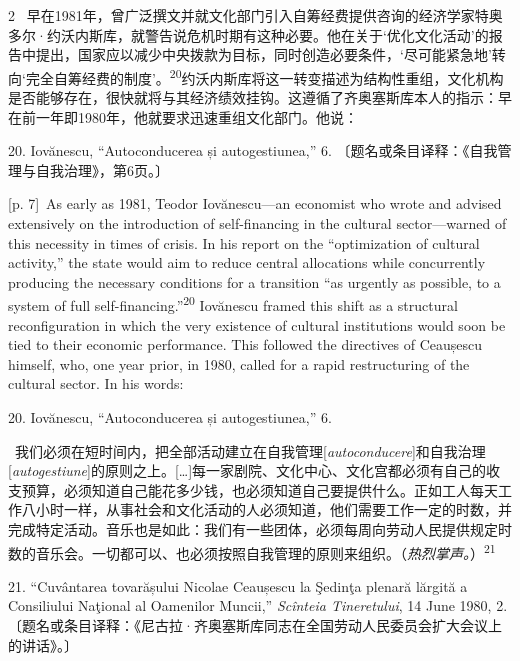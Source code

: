 \documentclass[10pt,a4paper]{article}
\begin{document}
\begin{paracol}{2}
\switchcolumn*
{\scriptsize\color{gray} [p. 7]}\ 早在1981年，曾广泛撰文并就文化部门引入自筹经费提供咨询的经济学家特奥多尔·约沃内斯库，就警告说危机时期有这种必要。他在关于‘优化文化活动’的报告中提出，国家应以减少中央拨款为目标，同时创造必要条件，‘尽可能紧急地’转向‘完全自筹经费的制度’。\nobreak\textsuperscript{20}约沃内斯库将这一转变描述为结构性重组，文化机构是否能够存在，很快就将与其经济绩效挂钩。这遵循了齐奥塞斯库本人的指示：早在前一年即1980年，他就要求迅速重组文化部门。他说：\par{\small 20. Iovănescu, “Autoconducerea și autogestiunea,” 6. 〔题名或条目译释：《自我管理与自我治理》，第6页。〕\par}
\switchcolumn
{\scriptsize\color{gray} [p. 7]}\ As early as 1981, Teodor Iovănescu—an economist who wrote and advised extensively on the introduction of self-financing in the cultural sector—warned of this necessity in times of crisis. In his report on the “optimization of cultural activity,” the state would aim to reduce central allocations while concurrently producing the necessary conditions for a transition “as urgently as possible, to a system of full self-financing.”\nobreak\textsuperscript{20} Iovănescu framed this shift as a structural reconfiguration in which the very existence of cultural institutions would soon be tied to their economic performance. This followed the directives of Ceaușescu himself, who, one year prior, in 1980, called for a rapid restructuring of the cultural sector. In his words:\par{\small 20. Iovănescu, “Autoconducerea și autogestiunea,” 6.\par}
\switchcolumn*
{\scriptsize\color{gray} [p. 7]}\ 我们必须在短时间内，把全部活动建立在自我管理[\textit{autoconducere}]和自我治理[\textit{autogestiune}]的原则之上。[…]每一家剧院、文化中心、文化宫都必须有自己的收支预算，必须知道自己能花多少钱，也必须知道自己要提供什么。正如工人每天工作八小时一样，从事社会和文化活动的人必须知道，他们需要工作一定的时数，并完成特定活动。音乐也是如此：我们有一些团体，必须每周向劳动人民提供规定时数的音乐会。一切都可以、也必须按照自我管理的原则来组织。（\textit{热烈掌声。}）\nobreak\textsuperscript{21}\par{\small 21. “Cuvântarea tovarășului Nicolae Ceaușescu la Şedinţa plenară lărgită a Consiliului Naţional al Oamenilor Muncii,” \textit{Scînteia Tineretului}, 14 June 1980, 2. 〔题名或条目译释：《尼古拉·齐奥塞斯库同志在全国劳动人民委员会扩大会议上的讲话》。〕\par}
\switchcolumn

\end{paracol}
\end{document}
